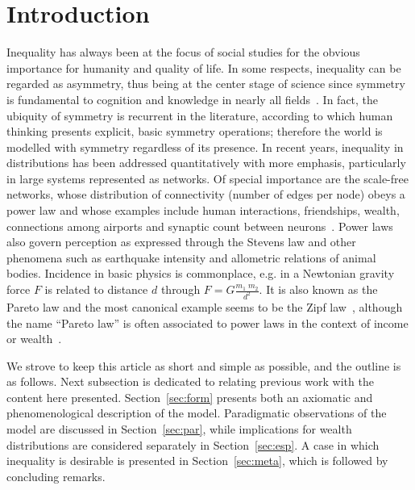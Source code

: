 \documentclass[10pt,letterpaper]{article}
\begin{document}
\linenumbers

\section*{Introduction}
Inequality has always been at the focus of social studies for the obvious importance for humanity and quality of life.
In some respects, inequality can be regarded as asymmetry, thus being at the center stage of science since symmetry is fundamental to cognition and knowledge in nearly all fields~\cite{deleuze,part}.
In fact, the ubiquity of symmetry is recurrent in the literature, according to which human thinking presents explicit, basic symmetry operations; therefore the world is modelled with symmetry regardless of its presence.
In recent years, inequality in distributions has been addressed quantitatively with more emphasis, particularly in large systems represented as networks.
Of special importance are the scale-free networks, whose distribution of connectivity (number of edges per node) obeys a power law
and whose
examples include human interactions, friendships, wealth, 
connections among airports and synaptic count between neurons~\cite{newman}.
Power laws also govern perception as expressed through the Stevens law
and other phenomena such as
earthquake intensity and allometric relations of animal bodies.
Incidence in basic physics is commonplace, e.g. in a Newtonian gravity force $F$ is related to distance $d$ through
$F=G\frac{m_1\;m_2}{d^2}$.
It is also known as the Pareto law and the most canonical example seems to be the Zipf law~\cite{newmanpower},
although the name ``Pareto law'' is often associated to power laws in the context of income or wealth~\cite{lada,economics}.

We strove to keep this article as short and simple as possible, and the outline is as follows.
Next subsection is dedicated to relating previous work with the content here presented.
Section~\ref{sec:form} presents both an axiomatic and phenomenological description of the model.
Paradigmatic observations of the model are discussed in Section~\ref{sec:par},
while implications for wealth distributions are considered separately in Section~\ref{sec:esp}.
A case in which inequality is desirable is presented in Section~\ref{sec:meta}, which is followed by concluding remarks.
\end{document}
